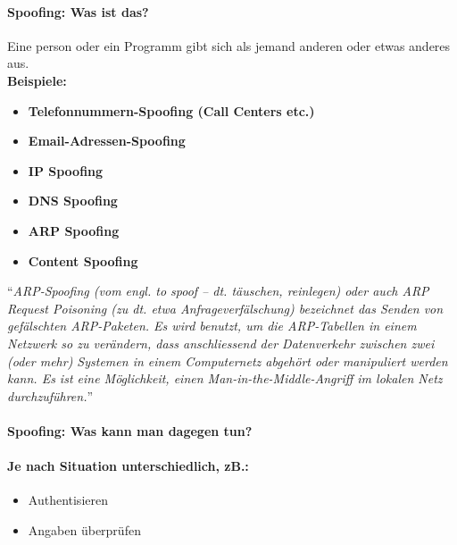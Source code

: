 \documentclass[10pt,a4paper]{article}
\begin{document}
\paragraph*{Spoofing: Was ist das?}
Eine person oder ein Programm gibt sich als jemand anderen oder etwas anderes aus.\\
\textbf{Beispiele:}
\begin{itemize}[noitemsep,topsep=0pt,leftmargin=*]
    \item \textbf{Telefonnummern-Spoofing (Call Centers etc.)}
    \item \textbf{Email-Adressen-Spoofing}
    \item \textbf{IP Spoofing}
    \item \textbf{DNS Spoofing}
    \item \textbf{ARP Spoofing}
    \item \textbf{Content Spoofing}
\end{itemize}
\vspace{0.5cm}
\noindent
"`\textsl{ARP-Spoofing (vom engl. to spoof – dt. täuschen, reinlegen) oder auch ARP Request Poisoning (zu dt. etwa Anfrageverfälschung) bezeichnet das Senden von gefälschten ARP-Paketen. Es wird benutzt, um die ARP-Tabellen in einem Netzwerk so zu verändern, dass anschliessend der Datenverkehr zwischen zwei (oder mehr) Systemen in einem Computernetz abgehört oder manipuliert werden kann. Es ist eine Möglichkeit, einen Man-in-the-Middle-Angriff im lokalen Netz durchzuführen.}"'\cite{wiki}

\paragraph*{Spoofing: Was kann man dagegen tun?}
\paragraph*{Je nach Situation unterschiedlich, zB.:}
\begin{itemize}[noitemsep,topsep=0pt,leftmargin=*]
    \item {Authentisieren}
    \item {Angaben überprüfen}
\end{itemize}

%
 
\end{document}
